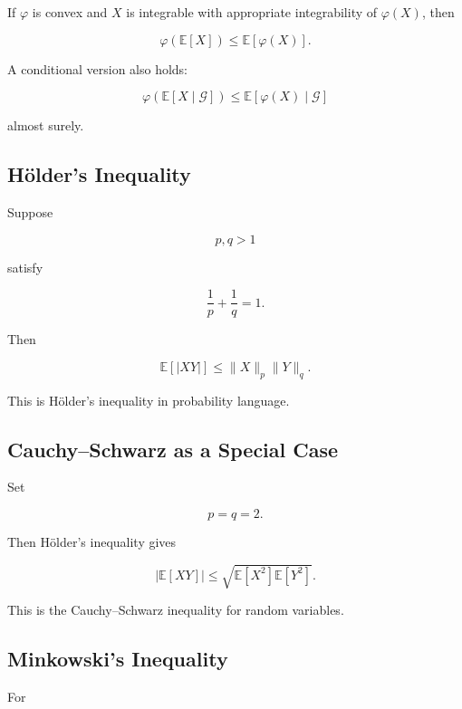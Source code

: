 If \(\varphi\) is convex and \(X\) is integrable with appropriate
integrability of \(\varphi(X)\), then

\[
\boxed{
\varphi(\mathbb{E}[X])
\leq
\mathbb{E}[\varphi(X)].
}
\]

A conditional version also holds:

\[
\boxed{
\varphi
\left(
\mathbb{E}[X\mid\mathcal{G}]
\right)
\leq
\mathbb{E}
[
\varphi(X)
\mid
\mathcal{G}
]
}
\]

almost surely.

\subsection{Hölder's Inequality}
\label{subsec:holder-probability}

Suppose

\[
p,q>1
\]

satisfy

\[
\frac1p+\frac1q=1.
\]

Then

\[
\boxed{
\mathbb{E}[|XY|]
\leq
\|X\|_p
\|Y\|_q.
}
\]

This is Hölder's inequality in probability language.

\subsection{Cauchy--Schwarz as a Special Case}
\label{subsec:cauchy-schwarz-measure-probability}

Set

\[
p=q=2.
\]

Then Hölder's inequality gives

\[
\boxed{
|\mathbb{E}[XY]|
\leq
\sqrt{
\mathbb{E}[X^2]
\mathbb{E}[Y^2]
}.
}
\]

This is the Cauchy--Schwarz inequality for random variables.

\subsection{Minkowski's Inequality}
\label{subsec:minkowski-probability}

For

